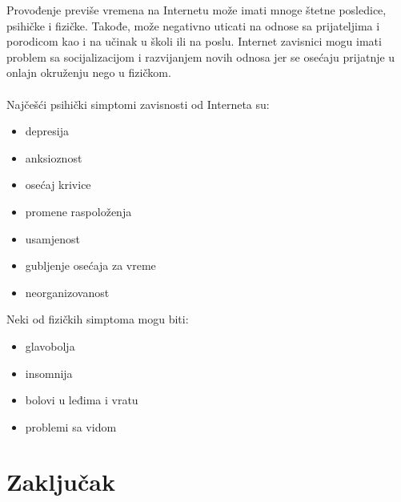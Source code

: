 \documentclass[a4paper]{article}
\begin{document}
Provođenje previše vremena na Internetu može imati mnoge štetne posledice, psihičke i fizičke. Takođe, može negativno uticati na odnose sa prijateljima i porodicom kao i na učinak u školi ili na poslu.
Internet zavisnici mogu imati problem sa socijalizacijom i razvijanjem novih odnosa jer se osećaju prijatnje u onlajn okruženju nego u fizičkom.\\\\ Najčešći psihički simptomi zavisnosti od Interneta su:
\begin{multicols}{2}
\begin{itemize}
    \item depresija
    \item anksioznost
    \item osećaj krivice
    \item promene raspoloženja
    \item usamjenost
    \item gubljenje osećaja za vreme
    \item neorganizovanost
\end{itemize}
\end{multicols}


Neki od fizičkih simptoma mogu biti:
\begin{multicols}{2}
\begin{itemize}
    \item glavobolja
    \item insomnija
    \item bolovi u leđima i vratu
    \item problemi sa vidom
\end{itemize}
\end{multicols}


\section{Zaključak}



\appendix
 

\appendix
\end{document}
